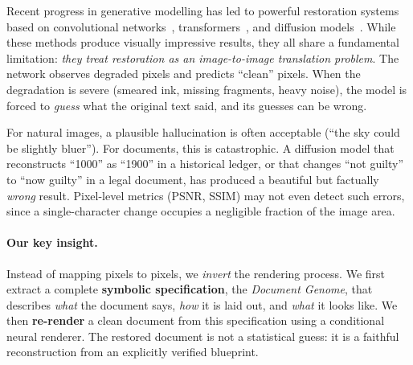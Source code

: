 \documentclass[conference]{IEEEtran}
\begin{document}
Recent progress in generative modelling has led to powerful restoration systems based
on convolutional networks~\cite{souibgui2020degan}, transformers~\cite{souibgui2022docentr},
and diffusion models~\cite{yang2023docdiff,chen2024diffhdr}.  While these methods produce
visually impressive results, they all share a fundamental limitation: \emph{they treat
restoration as an image-to-image translation problem}.  The network observes degraded
pixels and predicts ``clean'' pixels.  When the degradation is severe (smeared ink,
missing fragments, heavy noise), the model is forced to \emph{guess} what the original
text said, and its guesses can be wrong.

For natural images, a plausible hallucination is often acceptable (``the sky could be
slightly bluer'').  For documents, this is catastrophic.  A diffusion model that
reconstructs ``1000'' as ``1900'' in a historical ledger, or that changes ``not guilty''
to ``now guilty'' in a legal document, has produced a beautiful but factually
\emph{wrong} result.  Pixel-level metrics (PSNR, SSIM) may not even detect such errors,
since a single-character change occupies a negligible fraction of the image area.

\paragraph{Our key insight.}
Instead of mapping pixels to pixels, we \emph{invert} the rendering process.
We first extract a complete \textbf{symbolic specification}, the \emph{Document
Genome}, that describes \emph{what} the document says, \emph{how} it is laid out,
and \emph{what} it looks like.  We then \textbf{re-render} a clean document from this
specification using a conditional neural renderer.  The restored document is not a
statistical guess: it is a faithful reconstruction from an explicitly verified
blueprint.
\end{document}
